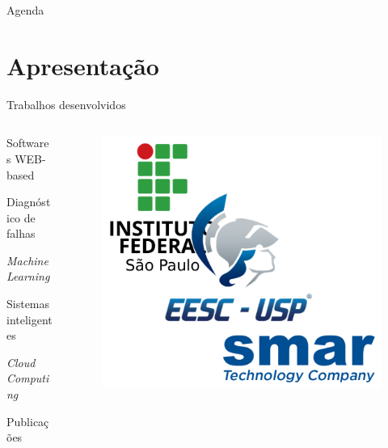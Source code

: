 \documentclass{uspBeamer}
\begin{document}
	\begin{frame}{Agenda}
		\tableofcontents
	\end{frame}
	
    \section{Apresentação}
    \begin{frame}{Trabalhos desenvolvidos}
        \begin{columns}
            \begin{column}{.6\textwidth}
                \begin{wideitemize}
                    \item Softwares WEB-based
                    \item Diagnóstico de falhas
                    \item \textit{Machine Learning}
                    \item Sistemas inteligentes
                    \item \textit{Cloud Computing}
                    \item Publicações
                \end{wideitemize}
            \end{column}
            \begin{column}{.4\textwidth}
                \begin{figure}
                    \includegraphics[scale=0.6]{triplice.png}
                \end{figure}
            \end{column}
        \end{columns}
    \end{frame}
\end{document}

